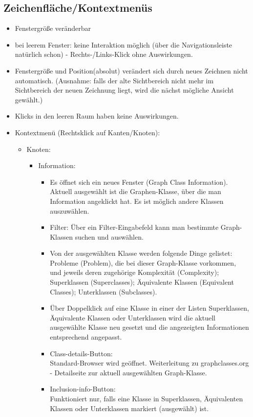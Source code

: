 \documentclass[10pt,a4paper]{article}
\begin{document}
\subsection{Zeichenfläche/Kontextmenüs}
\begin{itemize}
\item Fenstergröße veränderbar
\item bei leerem Fenster: keine Interaktion möglich (über die Navigationsleiste natürlich schon) - Rechts-/Links-Klick ohne Auswirkungen.
\item Fenstergröße und Position(absolut) verändert sich durch neues Zeichnen nicht automatisch. (Ausnahme: falls der alte Sichtbereich nicht mehr im Sichtbereich der neuen Zeichnung liegt, wird die nächst mögliche Ansicht gewählt.)
\item Klicks in den leeren Raum haben keine Auswirkungen.
\item Kontextmenü (Rechtsklick auf Kanten/Knoten):
\begin{itemize}
\item Knoten: 
\begin{itemize}
\item Information:
\begin{itemize}
\item Es öffnet sich ein neues Fenster (Graph Class Information). Aktuell ausgewählt ist die Graphen-Klasse, über die man Information angeklickt hat. Es ist möglich andere Klassen auszuwählen.
\item Filter: Über ein Filter-Eingabefeld kann man bestimmte Graph-Klassen suchen und auswählen.
\item Von der ausgewählten Klasse werden folgende Dinge gelistet: Probleme (Problem), die bei dieser Graph-Klasse vorkommen, und jeweils deren zugehörige Komplexität (Complexity); Superklassen (Superclasses); Äquivalente Klassen (Equivalent Classes); Unterklassen (Subclasses).
\item Über Doppelklick auf eine Klasse in einer der Listen Superklassen, Äquivalente Klassen oder Unterklassen wird die aktuell ausgewählte Klasse neu gesetzt und die angezeigten Informationen entsprechend angepasst.
\item Class-details-Button:\\ Standard-Browser wird geöffnet. Weiterleitung zu graphclasses.org - Detailseite zur aktuell ausgewählten Graph-Klasse.
\item Inclusion-info-Button: \\
Funktioniert nur, falls eine Klasse in Superklassen, Äquivalenten Klassen oder Unterklassen markiert (ausgewählt) ist.\\

\end{itemize}
\end{itemize}
\end{itemize}
\end{itemize}
\end{document}
